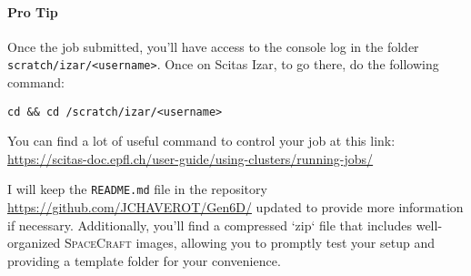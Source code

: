 \bigskip


\paragraph{Pro Tip} 
\bigskip
\noindent Once the job submitted, you'll have access to the console log in the folder \texttt{scratch/izar/<username>}. Once on Scitas Izar, to go there, do the following command:
{ \captionsetup{labelformat=empty,labelsep=none}
\begin{lstlisting}[style=bashstyle, caption=\null]
cd && cd /scratch/izar/<username>
\end{lstlisting}
}

\bigskip

\noindent You can find a lot of useful command to control your job at this link: \url{https://scitas-doc.epfl.ch/user-guide/using-clusters/running-jobs/}

\bigskip

\noindent I will keep the \texttt{README.md} file in the repository \url{https://github.com/JCHAVEROT/Gen6D/} updated to provide more information if necessary. Additionally, you'll find a compressed `zip` file that includes well-organized \textsc{SpaceCraft} images, allowing you to promptly test your setup and providing a template folder for your convenience.





\cleardoublepage{}